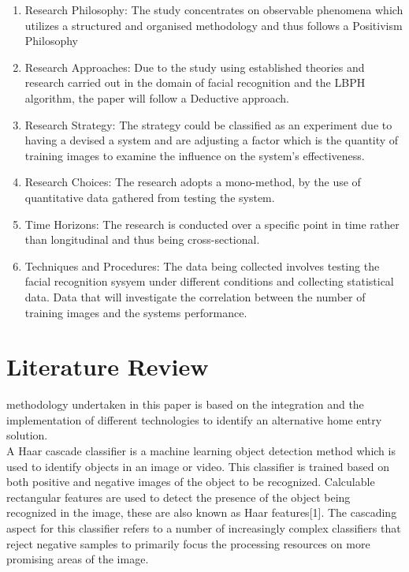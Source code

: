 \documentclass[journal]{IEEEtran}
\begin{document}
\begin{enumerate}
  \item Research Philosophy: The study concentrates on observable phenomena which utilizes a structured and organised methodology and thus follows a Positivism Philosophy 
  \item Research Approaches: Due to the study using  established theories and research carried out in the domain of facial recognition and the LBPH algorithm, the paper will follow a Deductive approach.
  \item Research Strategy: The strategy could be classified as an experiment due to having a devised a system and are adjusting a factor which is the quantity of training images to examine the influence on the system's effectiveness.
  \item Research Choices: The research adopts a mono-method, by the use of quantitative data gathered from testing the system.
  \item Time Horizons: The research is conducted over a specific point in time rather than longitudinal and thus being cross-sectional.
  \item Techniques and Procedures: The data being collected involves testing the facial recognition sysyem under different conditions and collecting statistical data. Data that will investigate the correlation between the number of training images and the systems performance.
\end{enumerate}



\section{Literature Review}
 methodology undertaken in this paper is based on the integration and the implementation of different technologies to identify an alternative home entry solution.\\

A Haar cascade classifier is a machine learning object detection method which is used to identify objects in an image or video. This classifier is trained based on both positive and negative images of the object to be recognized. Calculable rectangular features are used to detect the presence of the object being recognized in the image, these are also known as Haar features[1]. The cascading aspect for this classifier refers to a number of increasingly complex classifiers that reject negative samples to primarily focus the processing resources on more promising areas of the image.\\
\end{document}
